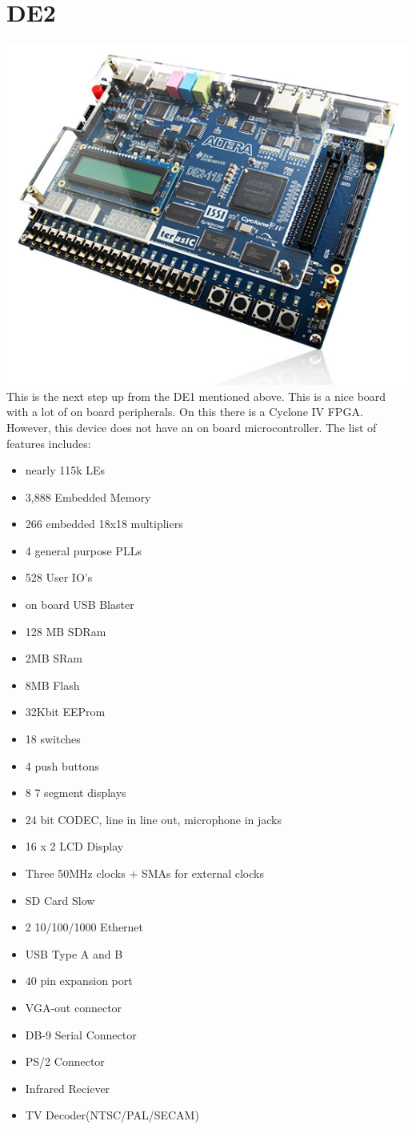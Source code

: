 \documentclass{article}
\begin{document}
	\newpage
	\section{DE2}
	\includegraphics[scale=0.5]{de2}
	This is the next step up from the DE1 mentioned above. This is a nice board with a lot of on board peripherals.
	On this there is a Cyclone IV FPGA. However, this device does not have an on board microcontroller. The list of features
	includes:
		\begin{itemize}
		\item nearly 115k LEs
		\item 3,888 Embedded Memory
		\item 266 embedded 18x18 multipliers
		\item 4 general purpose PLLs
		\item 528 User IO's
		\item on board USB Blaster
		\item 128 MB SDRam
		\item 2MB SRam
		\item 8MB Flash
		\item 32Kbit EEProm
		\item 18 switches
		\item 4 push buttons
		\item 8 7 segment displays
		\item 24 bit CODEC, line in line out, microphone in jacks
		\item 16 x 2 LCD Display
		\item Three 50MHz clocks + SMAs for external clocks
		\item SD Card Slow
		\item 2 10/100/1000 Ethernet
		\item USB Type A and B
		\item 40 pin expansion port
		\item VGA-out connector
		\item DB-9 Serial Connector
		\item PS/2 Connector
		\item Infrared Reciever
		\item TV Decoder(NTSC/PAL/SECAM)
		\end{itemize}
\end{document}
